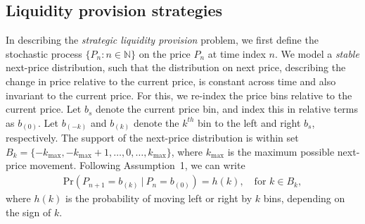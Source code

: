 \documentclass[sigconf, usenames, dvipsnames]{acmart}
\newcommand{\dcp}[1]{\textcolor{blue}{{\scriptsize{David:}}#1}}
\newcommand{\dcpadd}[1]{\textcolor{english}{#1}}
\begin{document}

\subsection{Liquidity provision strategies}\label{sec:lpstrat}

In describing the \textit{strategic liquidity provision} problem,
%
%
we first define the  stochastic process  $\{ P_n : n \in \mathbb{N} \}$ on the price $P_n$  at  time index $n$. 
%
%
%
%
We model a {\em stable} next-price distribution, such that the distribution on next price, describing the change in price relative to the current price, is constant across time and also invariant to the current price.
For this, we re-index the price bins relative to the current price. Let $b_s$ denote the current price bin,  and index this in relative terms as  $b_{(0)}$. Let $b_{(-k)}$ and $b_{(k)}$ denote the $k^{th}$ bin to the left and right $b_{s}$, respectively.
%
The support of the next-price distribution is within set  $B_k = \{-k_{\max}, -k_{\max}+1, \ldots, 0, \ldots, k_{\max}\}$, where $k_{\max}$ is the maximum possible next-price movement.
%
Following Assumption~1, we can write 
%
\begin{align}
    \mathrm{Pr}\left(P_{n+1}=b_{(k)}~|~P_n=b_{(0)}\right)=h(k),  \quad \text{for } k \in B_k,
\end{align}
%
where $h(k)$ is the probability of moving left or right by $k$ bins, depending on the sign of $k$.
%
\end{document}
